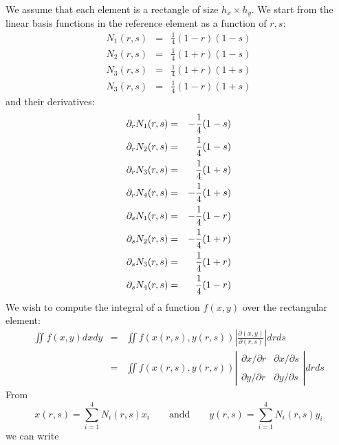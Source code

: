 We assume that each element is a rectangle of size $h_x \times h_y$. 
We start from the linear basis functions in the reference element as a function of $r,s$:
\begin{eqnarray}
N_1(r,s) &=& \frac{1}{4}(1-r)(1-s) \\ 
N_2(r,s) &=& \frac{1}{4}(1+r)(1-s) \\ 
N_3(r,s) &=& \frac{1}{4}(1+r)(1+s) \\ 
N_3(r,s) &=& \frac{1}{4}(1-r)(1+s) 
\end{eqnarray}
and their derivatives:
\begin{eqnarray}
\partial_r N_1(r,s) &=& -\frac{1}{4}(1-s) \nonumber\\
\partial_r N_2(r,s) &=& \frac{1}{4}(1-s) \nonumber\\
\partial_r N_3(r,s) &=& \frac{1}{4}(1+s) \nonumber\\
\partial_r N_4(r,s) &=& -\frac{1}{4}(1+s) \nonumber\\
\partial_s N_1(r,s) &=& -\frac{1}{4}(1-r) \nonumber\\
\partial_s N_2(r,s) &=& -\frac{1}{4}(1+r) \nonumber\\
\partial_s N_3(r,s) &=& \frac{1}{4}(1+r) \nonumber\\
\partial_s N_4(r,s) &=& \frac{1}{4}(1-r) \nonumber
\end{eqnarray}
We wish to compute the integral of a function $f(x,y)$ over the rectangular element:
\begin{eqnarray}
\iint f(x,y) dx dy 
&=& \iint f(x(r,s),y(r,s)) \left| \frac{\partial (x,y)}{\partial (r,s) } \right|  dr ds \\
&=& \iint f(x(r,s),y(r,s)) 
\left| 
\begin{array}{cc}
\partial x/\partial r & \partial x/\partial s \\ \\
\partial y/\partial r & \partial y/\partial s 
\end{array}
\right|  dr ds 
\end{eqnarray}
From 
\[
x(r,s)=\sum_{i=1}^4 N_i(r,s) x_i 
\qquad \text{andd} \qquad 
y(r,s)=\sum_{i=1}^4 N_i(r,s) y_i 
\]
we can write
